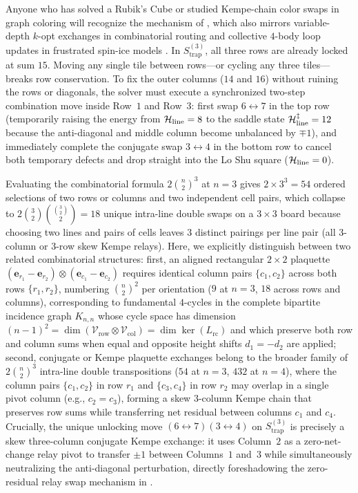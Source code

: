 Anyone who has solved a Rubik's Cube or studied Kempe-chain color swaps in graph coloring \cite{kempe1879geographical} will recognize the mechanism of , which also mirrors variable-depth $k$-opt exchanges in combinatorial routing \cite{lin1973effective} and collective $4$-body loop updates in frustrated spin-ice models \cite{pauling1935structure,bramwell2001spin}. In $S_{\mathrm{trap}}^{(3)}$, all three rows are already locked at sum $15$. Moving any single tile between rows---or cycling any three tiles---breaks row conservation. To fix the outer columns ($14$ and $16$) without ruining the rows or diagonals, the solver must execute a synchronized two-step combination move inside Row~$1$ and Row~$3$: first swap $6\leftrightarrow 7$ in the top row (temporarily raising the energy from $\mathcal{H}_{\mathrm{line}}=8$ to the saddle state $\mathcal{H}_{\mathrm{line}}^\ddagger = 12$ because the anti-diagonal and middle column become unbalanced by $\mp 1$), and immediately complete the conjugate swap $3\leftrightarrow 4$ in the bottom row to cancel both temporary defects and drop straight into the Lo Shu square ($\mathcal{H}_{\mathrm{line}} = 0$).

Evaluating the combinatorial formula $2\binom{n}{2}^3$ at $n=3$ gives $2\times 3^3 = 54$ ordered selections of two rows or columns and two independent cell pairs, which collapse to $2\binom{3}{2}\binom{\binom{3}{2}}{2} = 18$ unique intra-line double swaps on a $3\times 3$ board because choosing two lines and pairs of cells leaves $3$ distinct pairings per line pair (all $3$-column or $3$-row skew Kempe relays). Here, we explicitly distinguish between two related combinatorial structures: first, an aligned rectangular $2\times 2$ plaquette $(\mathbf{e}_{r_1}-\mathbf{e}_{r_2})\otimes(\mathbf{e}_{c_1}-\mathbf{e}_{c_2})$ requires identical column pairs $\{c_1, c_2\}$ across both rows $\{r_1, r_2\}$, numbering $\binom{n}{2}^2$ per orientation ($9$ at $n=3$, $18$ across rows and columns), corresponding to fundamental $4$-cycles in the complete bipartite incidence graph $K_{n,n}$ whose cycle space has dimension $(n-1)^2 = \dim(\mathcal{V}_{\mathrm{row}}\otimes\mathcal{V}_{\mathrm{col}}) = \dim\ker(L_{\mathrm{rc}})$ and which preserve both row and column sums when equal and opposite height shifts $d_1 = -d_2$ are applied; second, conjugate or Kempe plaquette exchanges belong to the broader family of $2\binom{n}{2}^3$ intra-line double transpositions ($54$ at $n=3$, $432$ at $n=4$), where the column pairs $\{c_1, c_2\}$ in row $r_1$ and $\{c_3, c_4\}$ in row $r_2$ may overlap in a single pivot column (e.g., $c_2 = c_3$), forming a skew $3$-column Kempe chain that preserves row sums while transferring net residual between columns $c_1$ and $c_4$. Crucially, the unique unlocking move $(6\leftrightarrow 7)(3\leftrightarrow 4)$ on $S_{\mathrm{trap}}^{(3)}$ is precisely a skew three-column conjugate Kempe exchange: it uses Column~$2$ as a zero-net-change relay pivot to transfer $\pm 1$ between Columns~$1$ and~$3$ while simultaneously neutralizing the anti-diagonal perturbation, directly foreshadowing the zero-residual relay swap mechanism in .

